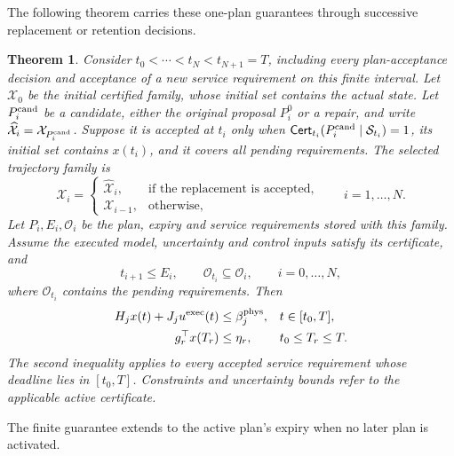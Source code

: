 \documentclass[preprint,12pt]{elsarticle}
\theoremstyle{definition}
\theoremstyle{plain}
\newtheorem{theorem}{Theorem}
\theoremstyle{definition}
\theoremstyle{plain}
\begin{document}
The following theorem carries these one-plan guarantees through successive
replacement or retention decisions.

\begin{theorem}
\label{thm:new-plan-closure}
Consider $t_0<\cdots<t_N<t_{N+1}=T$, including every plan-acceptance
decision and acceptance of a new service requirement on this finite
interval. Let $\mathcal X_0$ be the initial certified family, whose initial
set contains the actual state. Let $P_i^{\rm cand}$ be a candidate, either the original proposal
$P_i^0$ or a repair, and write
$\widehat{\mathcal X}_i=\mathcal X_{P_i^{\rm cand}}$. Suppose it is
accepted at $t_i$ only when
$\mathsf{Cert}_{t_i}(P_i^{\rm cand}\mid\mathcal S_{t_i})=1$, its
initial set contains $x(t_i)$, and it covers all pending requirements.
The selected trajectory family is
\begin{equation}
\mathcal X_i=\begin{cases}
\widehat{\mathcal X}_i,&\text{if the replacement is accepted},\\
\mathcal X_{i-1},&\text{otherwise},
\end{cases}\qquad i=1,\ldots,N.
\label{eq:execution-family-update}
\end{equation}
Let $P_i,E_i,\mathcal O_i$ be the plan, expiry and service requirements stored
with this family. Assume the executed model, uncertainty and control inputs
satisfy its certificate, and
\[
t_{i+1}\le E_i,\qquad \mathcal O_{t_i}\subseteq\mathcal O_i,
\qquad i=0,\ldots,N,
\]
where $\mathcal O_{t_i}$ contains the pending requirements.
Then
\begin{equation}
\begin{aligned}
H_jx(t)+J_ju^{\rm exec}(t)&\le\beta_j^{\rm phys},
 &&t\in[t_0,T],\\
g_r^\top x(T_r)&\le\eta_r,
 &&t_0\le T_r\le T.
\end{aligned}
\label{eq:execution-physical-service}
\end{equation}
The second inequality applies to every accepted service requirement
whose deadline lies in $[t_0,T]$. Constraints and uncertainty bounds
refer to the applicable active certificate.
\end{theorem}
The finite guarantee extends to the active plan's expiry when no later
plan is activated.
\end{document}
